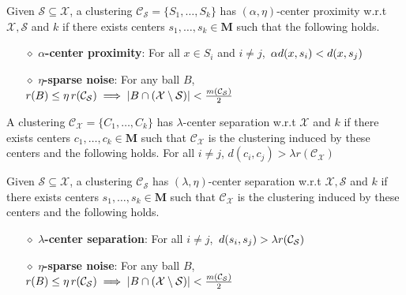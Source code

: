\documentclass[orivec]{llncs}
\newcommand{\mc}{\mathcal}
\newcommand{\mb}{\mathbf}
\begin{document}
\begin{definition}
\label{def:alphaeta}
Given $\mc S \subseteq \mc X$, a clustering $\mc C_{\mc S} = \{S_1, \ldots, S_k\}$ has $(\alpha, \eta)$-center proximity w.r.t $\mc X, \mc S$ and $k$ if there exists centers $s_1, \ldots, s_k \in \mb M$  such that the following holds.
\begin{itemize}[nolistsep, noitemsep]
\label{defn:alphacpnoise}	

\item[$\diamond$] {\bf $\alpha$-center proximity}: For all $x \in S_i$ and $i\neq j$, $\thinspace\alpha d(x, s_i) < d(x, s_j)$
\item[$\diamond$]{\bf $\eta$-sparse noise}: For any ball $B$, $r(B)\leq \eta \thinspace r(\mc{C}_{\mc S}) \implies |B\cap (\mc X\setminus \mc S)| < \frac{m(\mc C_{\mc S})}{2}$
\end{itemize}
\end{definition}

\begin{definition}
\label{defn:lambdacs}
A clustering $\mc C_{\mc X} = \{C_1, \ldots, C_k\}$ has $\lambda$-center separation w.r.t $\mc X$ and $k$ if there exists centers $c_1, \ldots, c_k \in \mb M$ such that $\mc C_{\mc X}$ is the clustering induced by these centers and the following holds. For all $i\neq j$, $d(c_i, c_j) > \lambda r(\mc{C}_{\mc{X}})$
\end{definition}

\begin{definition}
Given $\mc S \subseteq \mc X$, a clustering $\mc C_{\mc S}$ has $(\lambda, \eta)$-center separation w.r.t $\mc X, \mc S$ and $k$ if there exists centers $s_1, \ldots, s_k \in \mb M$ such that $\mc C_{\mc X}$ is the clustering induced by these centers and the following holds.

\begin{itemize}[nolistsep, noitemsep]
\label{defn:lambdacsnoise}	

\item[$\diamond$] {\bf $\lambda$-center separation}: For all $i\neq j$, $\thinspace d(s_i, s_j) > \lambda r({\mc C}_{\mc S})$
\item[$\diamond$]{\bf $\eta$-sparse noise}: For any ball $B$, $r(B)\leq \eta \thinspace r(\mc{C}_{\mc S}) \implies |B\cap (\mc X\setminus \mc S)| < \frac{m(\mc C_{\mc S})}{2}$
\end{itemize}
\end{definition}
\end{document}
